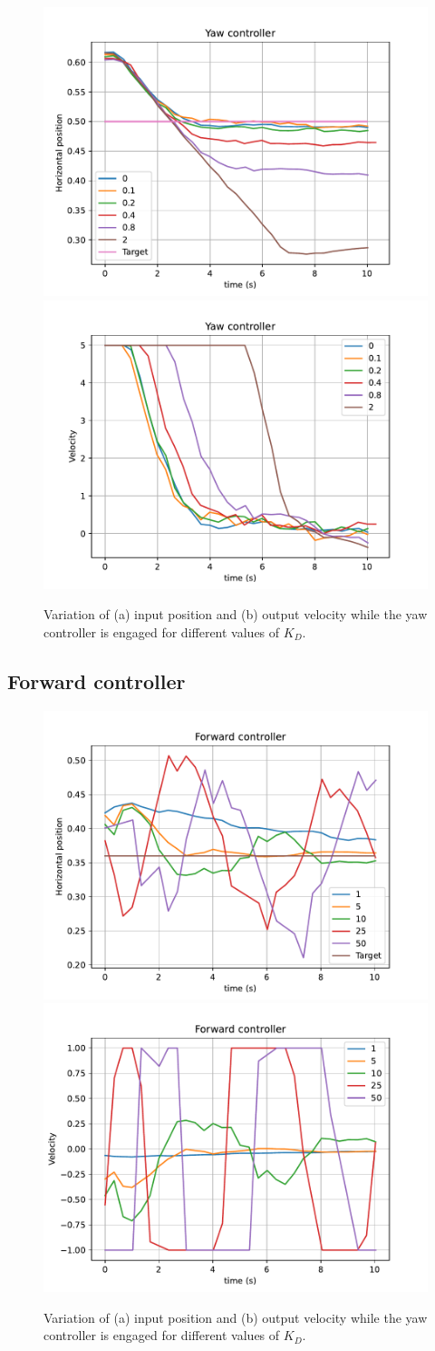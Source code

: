 \begin{figure}
  \centering
  \includegraphics[width=.45\linewidth]{img/4.1-tune/yaw_d2_feedback.pdf}
  \includegraphics[width=.45\linewidth]{img/4.1-tune/yaw_d2_speed.pdf}
  \caption{Variation of (a) input position and (b) output velocity while the yaw controller is engaged for different values of $K_{D}$.}\label{fig:tune-yaw-deriv}
\end{figure}

\subsection{Forward controller}

\begin{figure}
  \centering
  \includegraphics[width=.45\linewidth]{img/4.1-tune/fwd_p1_feedback.pdf}
  \includegraphics[width=.45\linewidth]{img/4.1-tune/fwd_p1_speed.pdf}
  \caption{Variation of (a) input position and (b) output velocity while the yaw controller is engaged for different values of $K_{D}$.}\label{fig:tune-yaw-deriv}
\end{figure}

